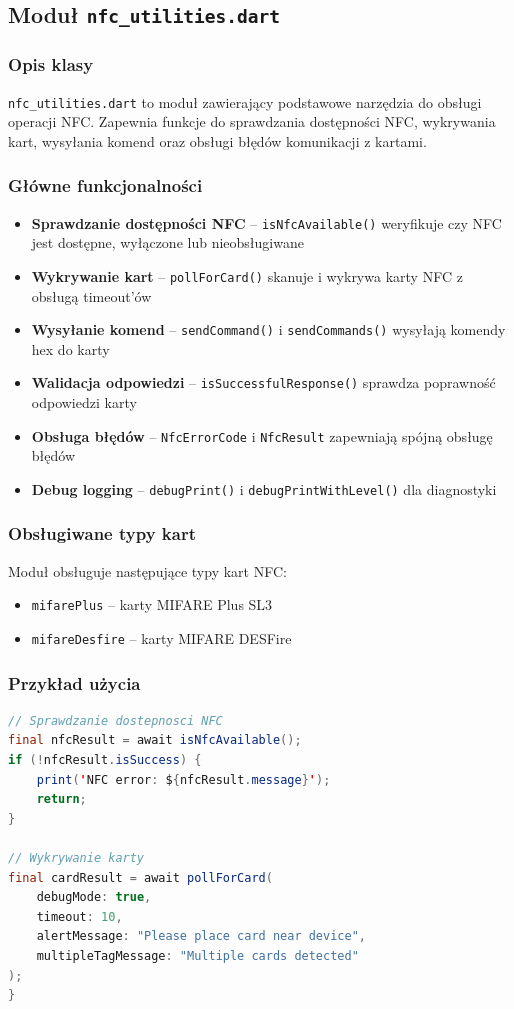 \documentclass[a4paper,12pt]{article}
\begin{document}
\subsection{Moduł \texttt{nfc\_utilities.dart}}

\subsubsection{Opis klasy}
\texttt{nfc\_utilities.dart} to moduł zawierający podstawowe narzędzia do obsługi operacji NFC. Zapewnia funkcje do sprawdzania dostępności NFC, wykrywania kart, wysyłania komend oraz obsługi błędów komunikacji z kartami.

\subsubsection{Główne funkcjonalności}
\begin{itemize}
    \item \textbf{Sprawdzanie dostępności NFC} -- \texttt{isNfcAvailable()} weryfikuje czy NFC jest dostępne, wyłączone lub nieobsługiwane
    \item \textbf{Wykrywanie kart} -- \texttt{pollForCard()} skanuje i wykrywa karty NFC z obsługą timeout'ów
    \item \textbf{Wysyłanie komend} -- \texttt{sendCommand()} i \texttt{sendCommands()} wysyłają komendy hex do karty
    \item \textbf{Walidacja odpowiedzi} -- \texttt{isSuccessfulResponse()} sprawdza poprawność odpowiedzi karty
    \item \textbf{Obsługa błędów} -- \texttt{NfcErrorCode} i \texttt{NfcResult} zapewniają spójną obsługę błędów
    \item \textbf{Debug logging} -- \texttt{debugPrint()} i \texttt{debugPrintWithLevel()} dla diagnostyki
\end{itemize}

\subsubsection{Obsługiwane typy kart}
Moduł obsługuje następujące typy kart NFC:
\begin{itemize}
    \item \texttt{mifarePlus} -- karty MIFARE Plus SL3
    \item \texttt{mifareDesfire} -- karty MIFARE DESFire
\end{itemize}

\subsubsection{Przykład użycia}
\begin{lstlisting}[language=Java]
// Sprawdzanie dostepnosci NFC
final nfcResult = await isNfcAvailable();
if (!nfcResult.isSuccess) {
    print('NFC error: ${nfcResult.message}');
    return;
}

// Wykrywanie karty
final cardResult = await pollForCard(
    debugMode: true,
    timeout: 10,
    alertMessage: "Please place card near device",
    multipleTagMessage: "Multiple cards detected"
);
}
\end{lstlisting}
\end{document}
